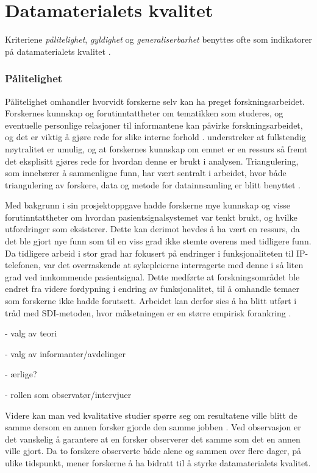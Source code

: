 \section{Datamaterialets kvalitet}
\label{kvalitativ_analyse}
Kriteriene \textit{pålitelighet}, \textit{gyldighet} og \textit{generaliserbarhet} benyttes ofte som indikatorer på datamaterialets kvalitet \citep{Tjora}.

\subsubsection{Pålitelighet}
Pålitelighet omhandler hvorvidt forskerne selv kan ha preget forskningsarbeidet. Forskernes kunnskap og forutinntattheter om tematikken som studeres, og eventuelle personlige relasjoner til informantene kan påvirke forskningsarbeidet, og det er viktig å gjøre rede for slike interne forhold \citep{Tjora}. \citet{Tjora} understreker at fullstendig nøytralitet er umulig, og at forskernes kunnskap om emnet er en ressurs så fremt det eksplisitt gjøres rede for hvordan denne er brukt i analysen. Triangulering, som innebærer å sammenligne funn, har vært sentralt i arbeidet, hvor både triangulering av forskere, data og metode for datainnsamling er blitt benyttet \citep{Oates}. 

\noindent
Med bakgrunn i sin prosjektoppgave hadde forskerne mye kunnskap og visse forutinntattheter om hvordan pasientsignalsystemet var tenkt brukt, og hvilke utfordringer som eksisterer. Dette kan derimot hevdes å ha vært en ressurs, da det ble gjort nye funn som til en viss grad ikke stemte overens med tidligere funn. Da tidligere arbeid i stor grad har fokusert på endringer i funksjonaliteten til IP-telefonen, var det overraskende at sykepleierne interragerte med denne i så liten grad ved innkommende pasientsignal. Dette medførte at forskningsområdet ble endret fra videre fordypning i endring av funksjonalitet, til å omhandle temaer som forskerne ikke hadde forutsett. Arbeidet kan derfor sies å ha blitt utført i tråd med SDI-metoden, hvor målsetningen er en større empirisk forankring \citep{Tjora}.

- valg av teori

- valg av informanter/avdelinger

- ærlige?

- rollen som observatør/intervjuer



\noindent
Videre kan man ved kvalitative studier spørre seg om resultatene ville blitt de samme dersom en annen forsker gjorde den samme jobben \citep{Tjora}. Ved observasjon er det  vanskelig å garantere at en forsker observerer det samme som det en annen ville gjort. Da to forskere observerte både alene og sammen over flere dager, på ulike tidspunkt, mener forskerne å ha bidratt til å styrke datamaterialets kvalitet. 


